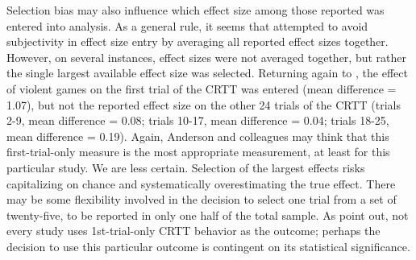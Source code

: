 \documentclass[man]{apa6}
\begin{document}
Selection bias may also influence which effect size among those reported was entered into analysis. As a general rule, it seems that \citet{Anderson:etal:2010} attempted to avoid subjectivity in effect size entry by averaging all reported effect sizes together. However, on several instances, effect sizes were not averaged together, but rather the single largest available effect size was selected. Returning again to \citet[study 2]{Anderson:etal:2004}, the effect of violent games on the first trial of the CRTT was entered (mean difference = 1.07), but not the reported effect size on the other 24 trials of the CRTT (trials 2-9, mean difference = 0.08; trials 10-17, mean difference = 0.04; trials 18-25, mean difference = 0.19). 
Again, Anderson and colleagues may think that this first-trial-only measure is the most appropriate measurement, at least for this particular study. We are less certain. Selection of the largest effects risks capitalizing on chance and systematically overestimating the true effect. There may be some flexibility involved in the decision to select one trial from a set of twenty-five, to be reported in only one half of the total sample. As \citet{Elson:etal:2014} point out, not every study uses 1st-trial-only CRTT behavior as the outcome; perhaps the decision to use this particular outcome is contingent on its statistical significance.
\end{document}
